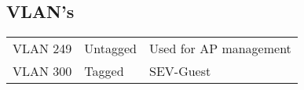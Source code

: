 \subsection{VLAN's}
\begin{tabular}{|l|l|l|}  \hline
	VLAN 249	& Untagged 		& Used for AP management		\\				
	VLAN 300	& Tagged		& SEV-Guest						\\

	\hline
\end{tabular}
